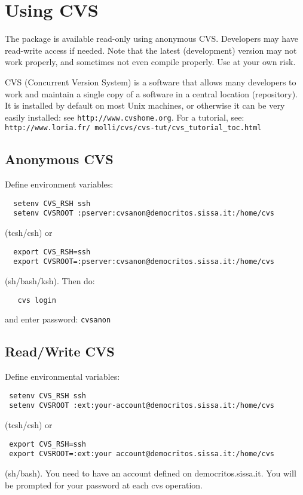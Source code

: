 \documentclass[12pt,a4paper]{article}
\begin{document}
\section{Using CVS}

The package is available read-only using anonymous CVS. Developers 
may have read-write access if needed. Note that the latest
(development) version may not work properly, and sometimes not 
even compile properly. Use at your own risk.

CVS (Concurrent Version System) is a software that allows many
developers to work and maintain a single copy of a software in
a central location (repository). It is installed by default on
most Unix machines, or otherwise it can be very easily installed:
see {\tt http://www.cvshome.org}. For a tutorial, see:\\
{\tt http://www.loria.fr/~{}molli/cvs/cvs-tut/cvs\_tutorial\_toc.html}

\subsection{Anonymous CVS}

Define environment variables:
\begin{verbatim}
  setenv CVS_RSH ssh
  setenv CVSROOT :pserver:cvsanon@democritos.sissa.it:/home/cvs
\end{verbatim}
(tcsh/csh) or
\begin{verbatim}
  export CVS_RSH=ssh
  export CVSROOT=:pserver:cvsanon@democritos.sissa.it:/home/cvs
\end{verbatim}
(sh/bash/ksh). Then do:
\begin{verbatim}
   cvs login
\end{verbatim}
and enter password: \texttt{cvsanon}

\subsection{Read/Write CVS}

Define environmental variables:
\begin{verbatim}
 setenv CVS_RSH ssh
 setenv CVSROOT :ext:your-account@democritos.sissa.it:/home/cvs
\end{verbatim}
(tcsh/csh) or
\begin{verbatim}
 export CVS_RSH=ssh
 export CVSROOT=:ext:your account@democritos.sissa.it:/home/cvs
\end{verbatim}
(sh/bash). You need to have an account defined on democritos.sissa.it.
You will be prompted for your password at each cvs operation.
\end{document}
